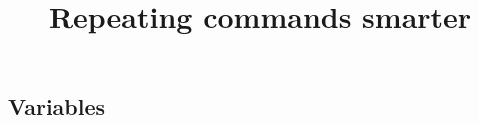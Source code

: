 \documentclass[11pt,professionalfonts]{beamer}
\title[Loops]{\large \textbf{Repeating commands smarter}}
\author{\vspace*{-0.3cm}}
\institute{
  \footnotesize
  {\normalsize\bf{Shankar Kulumani}}\\
  \vspace*{0.2cm}
    \textbf{Flight Dynamics \& Control Lab}\\ \vspace*{0.5cm}
  \begin{figure} %
        \texttt{[image: figures/gw\_txh\_2cs\_pos.pdf]}
    \end{figure}
}
\date{}
\begin{document}

\setcounter{framenumber}{-1}
\begin{frame} %
  \titlepage
\end{frame}   %

\section*{}
\subsection*{Variables}  
\end{document}
